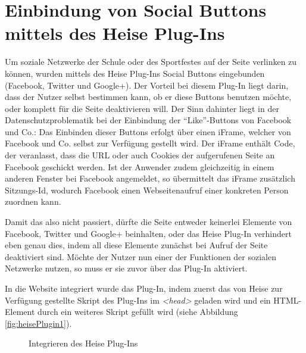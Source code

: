 \section{Einbindung von Social Buttons mittels des Heise Plug-Ins}
\label{Einbindung von Social Buttons mittels des Heise Plug-Ins}
Um soziale Netzwerke der Schule oder des Sportfestes auf der Seite verlinken zu können, wurden mittels des Heise Plug-Ins Social Buttons eingebunden (Facebook, Twitter und Google+). Der Vorteil bei diesem Plug-In liegt darin, dass der Nutzer selbst bestimmen kann, ob er diese Buttons benutzen möchte, oder komplett für die Seite deaktivieren will. Der Sinn dahinter liegt in der Datenschutzproblematik bei der Einbindung der "`Like"'-Buttons von Facebook und Co.: Das Einbinden dieser Buttons erfolgt über einen iFrame, welcher von Facebook und Co. selbst zur Verfügung gestellt wird. Der iFrame enthält Code, der veranlasst, dass die URL oder auch Cookies der aufgerufenen Seite an Facebook geschickt werden. Ist der Anwender zudem gleichzeitig in einem anderen Fenster bei Facebook angemeldet, so übermittelt das iFrame zusätzlich Sitzungs-Id, wodurch Facebook einen Webseitenaufruf einer konkreten Person zuordnen kann.
\par
Damit das also nicht passiert, dürfte die Seite entweder keinerlei Elemente von Facebook, Twitter und Google+ beinhalten, oder das Heise Plug-In verhindert eben genau dies, indem all diese Elemente zunächst bei Aufruf der Seite deaktiviert sind. Möchte der Nutzer nun einer der Funktionen der sozialen Netzwerke nutzen, so muss er sie zuvor über das Plug-In aktiviert.
\par
In die Website integriert wurde das Plug-In, indem zuerst das von Heise zur Verfügung gestellte Skript des Plug-Ins im \textit{<head>} geladen wird und ein HTML-Element durch ein weiteres Skript gefüllt wird (siehe Abbildung \vref{fig:heisePlugin1}).

\begin{figure}[!h]
	\caption{Integrieren des Heise Plug-Ins}
	\label{fig:heisePlugin1}
\end{figure}

